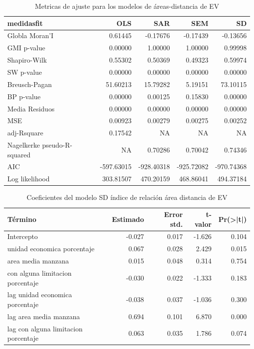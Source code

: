 \documentclass[12pt,a4paper,openany]{book}
\theoremstyle{definition}
\theoremstyle{definition}
\theoremstyle{definition}
\theoremstyle{remark}
\begin{document}
\begin{table}[t]

\caption{\label{tab:tabla-comp-modelos-areasdist}Metricas de ajuste para los modelos de áreas-distancia de EV}
\centering
\begin{tabular}{lrrrr}
\toprule
medidasfit & OLS & SAR & SEM & SD\\
\midrule
Globla Moran'I & 0.61445 & -0.17676 & -0.17439 & -0.13656\\
GMI p-value & 0.00000 & 1.00000 & 1.00000 & 0.99998\\
Shapiro-Wilk & 0.55302 & 0.50369 & 0.49323 & 0.59974\\
SW p-value & 0.00000 & 0.00000 & 0.00000 & 0.00000\\
Breusch-Pagan & 51.60213 & 15.79282 & 5.19151 & 73.10115\\
\addlinespace
BP p-value & 0.00000 & 0.00125 & 0.15830 & 0.00000\\
Media Residuos & 0.00000 & 0.00000 & 0.00000 & 0.00000\\
MSE & 0.00923 & 0.00279 & 0.00275 & 0.00252\\
adj-Rsquare & 0.17542 & NA & NA & NA\\
Nagelkerke pseudo-R-squared & NA & 0.70286 & 0.70042 & 0.74346\\
\addlinespace
AIC & -597.63015 & -928.40318 & -925.72082 & -970.74368\\
Log likelihood & 303.81507 & 470.20159 & 468.86041 & 494.37184\\
\bottomrule
\end{tabular}
\end{table}

\begin{table}[t]

\caption{\label{tab:coef-sd-areasdist}Coeficientes del modelo SD índice de relación área distancia de EV}
\centering
\begin{tabular}{lrrrr}
\toprule
Término & Estimado & Error std. & t-valor & Pr(>|t|)\\
\midrule
Intercepto & -0.027 & 0.017 & -1.626 & 0.104\\
unidad economica porcentaje & 0.067 & 0.028 & 2.429 & 0.015\\
area media manzana & 0.015 & 0.048 & 0.314 & 0.754\\
con alguna limitacion porcentaje & -0.030 & 0.022 & -1.333 & 0.183\\
lag unidad economica porcentaje & -0.038 & 0.037 & -1.036 & 0.300\\
\addlinespace
lag area media manzana & 0.694 & 0.101 & 6.870 & 0.000\\
lag con alguna limitacion porcentaje & 0.063 & 0.035 & 1.786 & 0.074\\
\bottomrule
\end{tabular}
\end{table}
\end{document}
